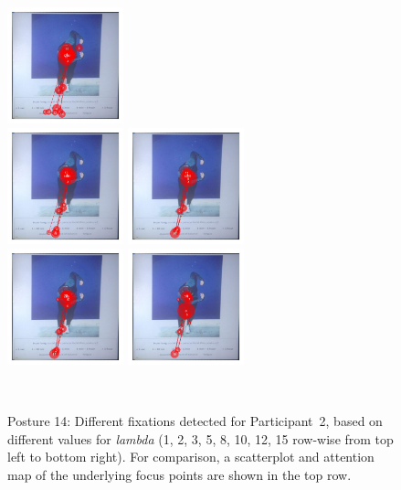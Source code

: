 \documentclass[11pt]{asaproc}
\begin{document}
\begin{figure}[t]
\begin{center}
\includegraphics[width=0.30\textwidth]{figures/Subject13_scanpath_posture14_lambda_5.jpg} \\
\includegraphics[width=0.30\textwidth]{figures/Subject13_scanpath_posture14_lambda_8.jpg} \hspace{1pt}
\includegraphics[width=0.30\textwidth]{figures/Subject13_scanpath_posture14_lambda_10.jpg} \\
\includegraphics[width=0.30\textwidth]{figures/Subject13_scanpath_posture14_lambda_12.jpg} \hspace{1pt}
\includegraphics[width=0.30\textwidth]{figures/Subject13_scanpath_posture14_lambda_15.jpg}
\end{center} ~\\[-1.5cm]
\caption{\label{Fixations14}Posture 14: Different fixations detected for Participant~2, based on different values
for {\it lambda} (1, 2, 3, 5, 8, 10, 12, 15 row-wise from top left to bottom right). For comparison,
a scatterplot and attention map of the underlying focus points are shown in the top row.}
\end{figure}
\end{document}
